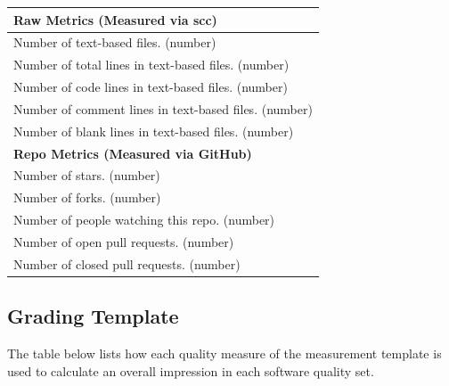 \documentclass[12pt, notitlepage]{article}
\begin{document}
\begin{singlespace}
\def\arraystretch{1.4}
\begin{tabular}{p{16cm}}
	\hline		
	\textbf{Raw Metrics (Measured via scc)}\\
	\hline
	Number of text-based files. (number)\\
	Number of total lines in text-based files. (number)\\
	Number of code lines in text-based files. (number)\\
	Number of comment lines in text-based files. (number)\\
	Number of blank lines in text-based files. (number)\\
	\hline
	\textbf{Repo Metrics (Measured via GitHub)}\\
	\hline
	Number of stars. (number)\\
	Number of forks. (number)\\
	Number of people watching this repo. (number)\\
	Number of open pull requests. (number)\\
	Number of closed pull requests. (number)\\
	\hline
\end{tabular}

\newpage

\subsection{Grading Template}\label{gradingtemplate2}
The table below lists how each quality measure of the measurement template is used to calculate an overall impression in each software quality set.\newline


\end{singlespace}
\end{document}

